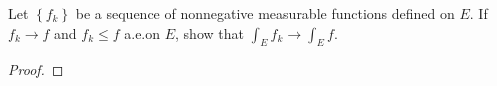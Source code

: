 \begin{problem}
Let $\left\{f_k\right\}$ be a sequence of nonnegative measurable functions
defined on $E$. If $f_k\to f$ and $f_k\leq f$ a.e.\@ on $E$, show that
$\int_E f_k\to\int_E f$.
\end{problem}
\begin{proof}
\end{proof}

